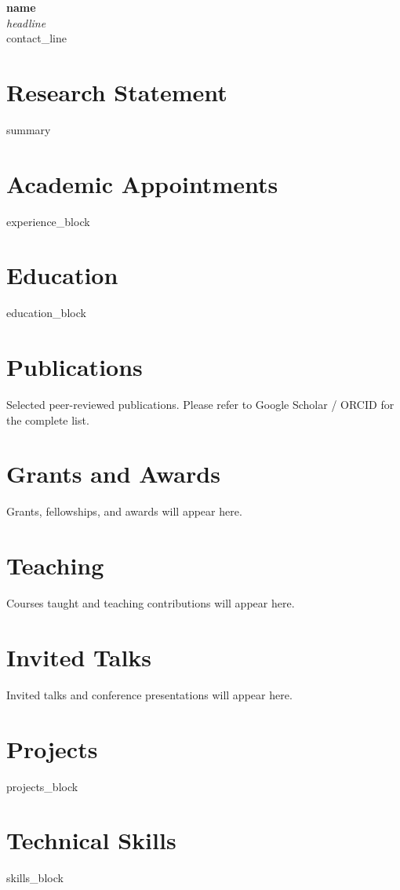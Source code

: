 \documentclass[11pt,a4paper]{article}
\begin{document}
\begin{center}
  {\Huge\bfseries {{name}}}\\[3pt]
  {\normalsize\itshape {{headline}}}\\[4pt]
  {\small {{contact_line}}}
\end{center}

\section*{Research Statement}
{{summary}}

\section*{Academic Appointments}
{{experience_block}}

\section*{Education}
{{education_block}}

\section*{Publications}
Selected peer-reviewed publications. Please refer to Google Scholar / ORCID for
the complete list.

\section*{Grants and Awards}
Grants, fellowships, and awards will appear here.

\section*{Teaching}
Courses taught and teaching contributions will appear here.

\section*{Invited Talks}
Invited talks and conference presentations will appear here.

\section*{Projects}
{{projects_block}}

\section*{Technical Skills}
{{skills_block}}
\end{document}
